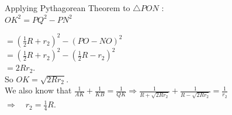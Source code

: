 \documentclass{article}
\begin{document}
Applying Pythagorean Theorem to \(\triangle P O N\) :\\
\(O K^{2}=P Q^{2}-P N^{2}\)


\(=\left(\frac{1}{2} R+r_{2}\right)^{2}-(P O-N O)^{2}\)\\
\(=\left(\frac{1}{2} R+r_{2}\right)^{2}-\left(\frac{1}{2} R-r_{2}\right)^{2}\)\\
\(=2 R r_{2}\).\\
So \(O K=\sqrt{2 R r_{2}}\).\\
We also know that \(\frac{1}{A K}+\frac{1}{K B}=\frac{1}{Q K} \Rightarrow \frac{1}{R+\sqrt{2 R r_{2}}}+\frac{1}{R-\sqrt{2 R r_{2}}}=\frac{1}{r_{2}}\)\\
\(\Rightarrow \quad r_{2}=\frac{1}{4} R\).
\end{document}
